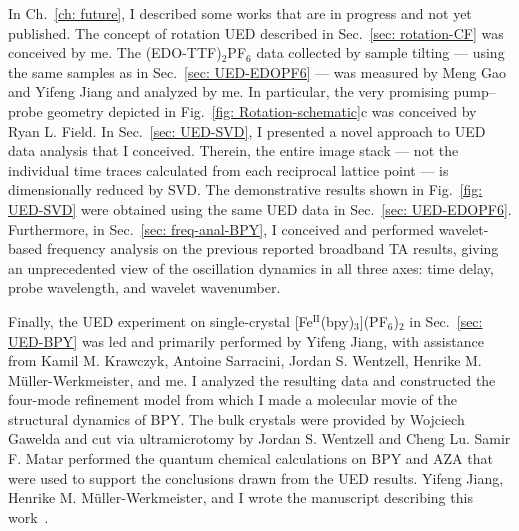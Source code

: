 In Ch.~\ref{ch: future}, I described some works that are in progress and not yet published.
%
The concept of rotation UED described in Sec.~\ref{sec: rotation-CF} was conceived by me.
The (EDO-TTF)$_2$PF$_6$ data collected by sample tilting
--- using the same samples as in Sec.~\ref{sec: UED-EDOPF6} ---
was measured by Meng Gao and Yifeng Jiang and analyzed by me.
In particular, the very promising pump--probe geometry depicted in Fig.~\ref{fig: Rotation-schematic}c
was conceived by Ryan L. Field.
%
In Sec.~\ref{sec: UED-SVD}, I presented a novel approach to UED data analysis
that I conceived. Therein, the entire image stack
--- not the individual time traces calculated from each reciprocal lattice point ---
is dimensionally reduced by SVD. The demonstrative results shown in Fig.~\ref{fig: UED-SVD}
were obtained using the same UED data in Sec.~\ref{sec: UED-EDOPF6}.
%
Furthermore, in Sec.~\ref{sec: freq-anal-BPY},
I conceived and performed wavelet-based frequency analysis on the previous reported broadband TA results,
giving an unprecedented view of the oscillation dynamics in all three axes: time delay, probe wavelength,
and wavelet wavenumber.

Finally, the UED experiment on single-crystal [Fe$^\text{II}$(bpy)$_3$](PF$_6$)$_2$
in Sec.~\ref{sec: UED-BPY} was led and primarily performed by Yifeng Jiang,
with assistance from Kamil M. Krawczyk, Antoine Sarracini, Jordan S. Wentzell,
Henrike M. M\"{u}ller-Werkmeister, and me.
%
I analyzed the resulting data and constructed the four-mode refinement model from which
I made a molecular movie of the structural dynamics of BPY.
The bulk crystals were provided by Wojciech Gawelda and cut via ultramicrotomy
by Jordan S. Wentzell and Cheng Lu.
Samir F. Matar performed the quantum chemical calculations on BPY and AZA
that were used to support the conclusions drawn from the UED results.
%
Yifeng Jiang, Henrike M. M\"{u}ller-Werkmeister, and I wrote
the manuscript describing this work~\cite{Jiang2019}.



%
